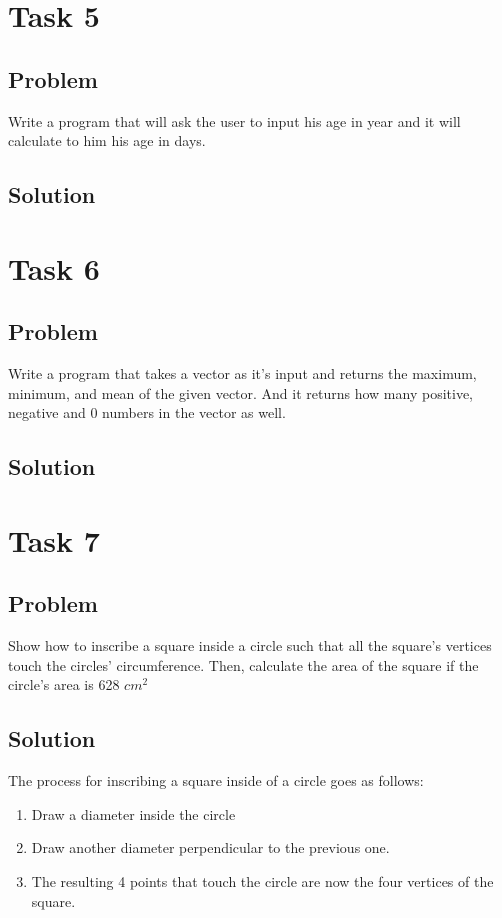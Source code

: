 \documentclass[a4paper, 10pt]{article}
\begin{document}
	\section{Task 5}
	
		\subsection{Problem}
			\noindent Write a program that will ask the user to input his age in year and it will calculate to him his age in days.
		\subsection{Solution}
			
	\section{Task 6}
	
		\subsection{Problem}
			\noindent Write a program that takes a vector as it’s input and returns the maximum, minimum, and mean of the given vector. And it returns how many positive, negative and 0 numbers in the vector as well.
		\subsection{Solution}
			
	\section{Task 7}
	
		\subsection{Problem}
			\noindent Show how to inscribe a square inside a circle such that all the square’s vertices touch the circles’ circumference. Then, calculate the area of the square if the circle’s area is 628 $cm^2$
		\subsection{Solution}
			\noindent The process for inscribing a square inside of a circle goes as follows:
			\begin{enumerate}
				\item Draw a diameter inside the circle
				\item Draw another diameter perpendicular to the previous one.
				\item The resulting 4 points that touch the circle are now the four vertices of the square. 
			\end{enumerate}
		
\end{document}

